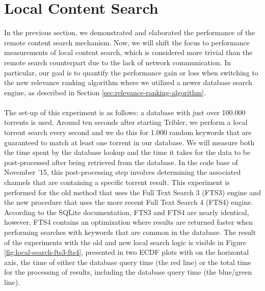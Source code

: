 \section{Local Content Search}
\label{sec:local-content-search}
In the previous section, we demonstrated and elaborated the performance of the remote content search mechanism. Now, we will shift the focus to performance measurements of local content search, which is considered more trivial than the remote search counterpart due to the lack of network communication. In particular, our goal is to quantify the performance gain or loss when switching to the new relevance ranking algorithm where we utilized a newer database search engine, as described in Section \ref{sec:relevance-ranking-algorithm}.\\\\
The set-up of this experiment is as follows: a database with just over 100.000 torrents is used. Around ten seconds after starting Tribler, we perform a local torrent search every second and we do this for 1.000 random keywords that are guaranteed to match at least one torrent in our database. We will measure both the time spent by the database lookup and the time it takes for the data to be post-processed after being retrieved from the database. In the code base of November '15, this post-processing step involves determining the associated channels that are containing a specific torrent result. This experiment is performed for the old method that uses the Full Text Search 3 (FTS3) engine and the new procedure that uses the more recent Full Text Search 4 (FTS4) engine. According to the SQLite documentation, FTS3 and FTS4 are nearly identical, however, FTS4 contains an optimization where results are returned faster when performing searches with keywords that are common in the database. The result of the experiments with the old and new local search logic is visible in Figure \ref{fig:local-search-fts3-fts4}, presented in two ECDF plots with on the horizontal axis, the time of either the database query time (the red line) or the total time for the processing of results, including the database query time (the blue/green line).\\

